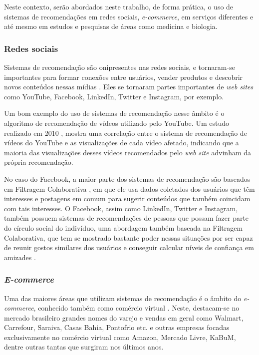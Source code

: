\documentclass[
	12pt,				%
	oneside,			%
	a4paper,			%
	chapter=TITLE,		%
	english,			%
	french,				%
	spanish,			%
	brazil				%
	]{abntex2}
\begin{document}
Neste contexto, serão abordados neste trabalho, de forma prática, o uso de sistemas de recomendações em redes sociais, \emph{e-commerce}, em serviços diferentes e até mesmo em estudos e pesquisas de áreas como medicina e biologia.

\subsubsection{Redes sociais}

Sistemas de recomendação são onipresentes nas redes sociais, e tornaram-se importantes para formar conexões entre usuários, vender produtos e descobrir novos conteúdos nessas mídias \cite{burke2007hybrid}. Eles se tornaram partes importantes de \emph{web sites} como YouTube, Facebook, LinkedIn, Twitter e Instagram, por exemplo.

Um bom exemplo do uso de sistemas de recomendação nesse âmbito é o algoritmo de recomendação de vídeos utilizado pelo YouTube. Um estudo realizado em 2010 \cite{zhou2010impact}, mostra uma correlação entre o sistema de recomendação de vídeos do YouTube e as visualizações de cada vídeo afetado, indicando que a maioria das visualizações desses vídeos recomendados pelo \emph{web site} advinham da própria recomendação.

No caso do Facebook, a maior parte dos sistemas de recomendação são baseados em Filtragem Colaborativa \cite{shapira2013facebook}, em que ele usa dados coletados dos usuários que têm interesses e postagens em comum para sugerir conteúdos que também coincidam com tais interesses. O Facebook, assim como LinkedIn, Twitter e Instagram, também possuem sistemas de recomendações de pessoas que possam fazer parte do círculo social do indivíduo, uma abordagem também baseada na Filtragem Colaborativa, que tem se mostrado bastante poder nessas situações por ser capaz de reunir gostos similares dos usuários e conseguir calcular níveis de confiança em amizades \cite{chen2010social}.

\subsubsection{\emph{E-commerce}}

Uma das maiores áreas que utilizam sistemas de recomendação é o âmbito do \emph{e-commerce}, conhecido também como comércio virtual \cite{schafer1999recommender}. Neste, destacam-se no mercado brasileiro grandes nomes do varejo e vendas em geral como Walmart, Carrefour, Saraiva, Casas Bahia, Pontofrio etc. e outras empresas focadas exclusivamente no comércio virtual como Amazon, Mercado Livre, KaBuM, dentre outras tantas que surgiram nos últimos anos.
\end{document}
